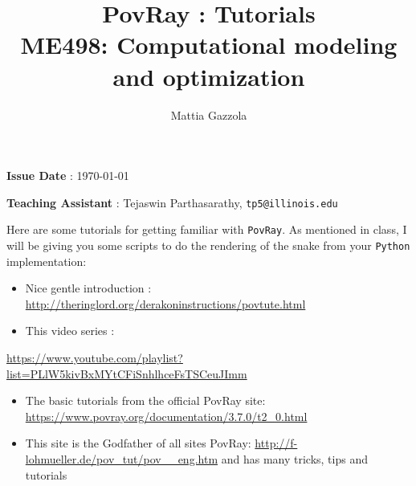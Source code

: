\documentclass[11pt]{article}
\author{Mattia Gazzola}
\date{}
\title{PovRay : Tutorials\\\medskip
\large ME498: Computational modeling and optimization}
\begin{document}
\maketitle
\textbf{Issue Date} : \today

\textbf{Teaching Assistant} : Tejaswin Parthasarathy, \texttt{tp5@illinois.edu}

Here are some tutorials for getting familiar with \texttt{PovRay}. As mentioned in
class, I will be giving you some scripts to do the rendering of the snake from
your \texttt{Python} implementation:
\begin{itemize}
\item Nice gentle introduction : \url{http://theringlord.org/derakoninstructions/povtute.html}
\item This video series :
\end{itemize}
\url{https://www.youtube.com/playlist?list=PLlW5kivBxMYtCFiSnhlhceFsTSCeuJImm}
\begin{itemize}
\item The basic tutorials from the official PovRay site: \url{https://www.povray.org/documentation/3.7.0/t2\_0.html}
\item This site is the Godfather of all sites PovRay:
\url{http://f-lohmueller.de/pov\_tut/pov\_\_eng.htm} and has many tricks, tips and tutorials
\end{itemize}
\end{document}
